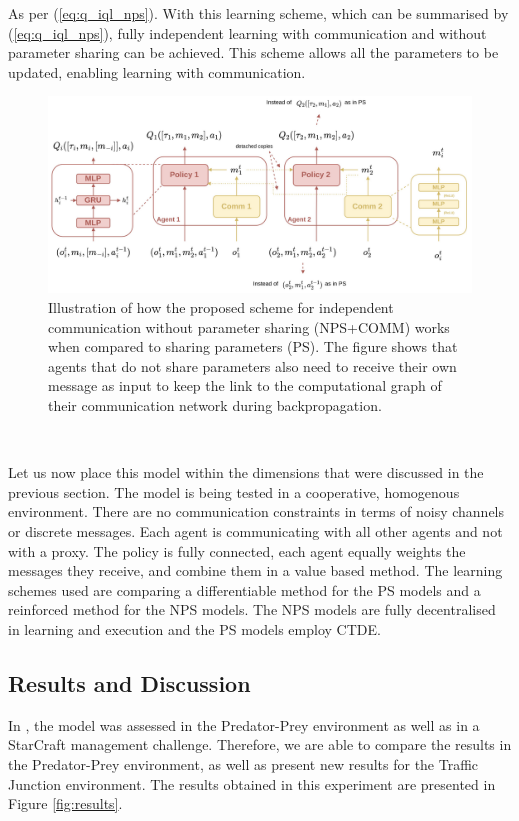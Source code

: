 \documentclass{article}
\begin{document}
As per (\ref{eq:q_iql_nps}). With this learning scheme, which can be summarised by (\ref{eq:q_iql_nps}), fully independent learning with communication and without parameter sharing can be achieved. This scheme allows all the parameters to be updated, enabling learning with communication.

\begin{figure}
	\centering
	\includegraphics[scale=0.4]{images/nps_comm.png}
	\caption{Illustration of how the proposed scheme for independent communication without parameter sharing (NPS+COMM) \citep{pina2024fully} works when compared to sharing parameters (PS). The figure shows that agents that do not share parameters also need to receive their own message as input to keep the link to the computational graph of their communication network during backpropagation.}
	\label{fig:nps_comm}
\end{figure}

\

Let us now place this model within the dimensions that were discussed in the previous section. The model is being tested in a cooperative, homogenous environment. There are no communication constraints in terms of noisy channels or discrete messages. Each agent is communicating with all other agents and not with a proxy. The policy is fully connected, each agent equally weights the messages they receive, and combine them in a value based method. The learning schemes used are comparing a differentiable method for the PS models and a reinforced method for the NPS models. The NPS models are fully decentralised in learning and execution and the PS models employ CTDE.

\subsection{Results and Discussion}

In \citet{pina2024fully}, the model was assessed in the Predator-Prey environment as well as in a StarCraft management challenge. Therefore, we are able to compare the results in the Predator-Prey environment, as well as present new results for the Traffic Junction environment. The results obtained in this experiment are presented in Figure \ref{fig:results}. 
\end{document}
